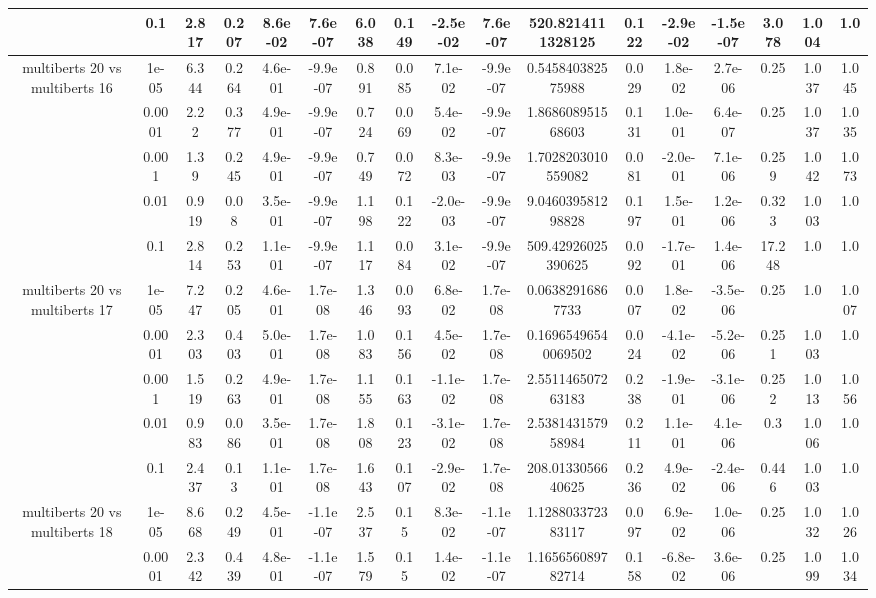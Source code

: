 \begin{tabular}{|c|c|c|c|c|c|c|c|c|c|c|c|c|c|c|c|c|}
 & 0.1 & 2.817 & 0.207 & 8.6e-02 & 7.6e-07 & 6.038 & 0.149 & -2.5e-02 & 7.6e-07 & 520.8214111328125 & 0.122 & -2.9e-02 & -1.5e-07 & 3.078 & 1.004 & 1.0 \\
\hline
\multirow{5}{*}{multiberts 20 vs multiberts 16} & 1e-05 & 6.344 & 0.264 & 4.6e-01 & -9.9e-07 & 0.891 & 0.085 & 7.1e-02 & -9.9e-07 & 0.545840382575988 & 0.029 & 1.8e-02 & 2.7e-06 & 0.25 & 1.037 & 1.045 \\
 & 0.0001 & 2.22 & 0.377 & 4.9e-01 & -9.9e-07 & 0.724 & 0.069 & 5.4e-02 & -9.9e-07 & 1.868608951568603 & 0.131 & 1.0e-01 & 6.4e-07 & 0.25 & 1.037 & 1.035 \\
 & 0.001 & 1.39 & 0.245 & 4.9e-01 & -9.9e-07 & 0.749 & 0.072 & 8.3e-03 & -9.9e-07 & 1.7028203010559082 & 0.081 & -2.0e-01 & 7.1e-06 & 0.259 & 1.042 & 1.073 \\
 & 0.01 & 0.919 & 0.08 & 3.5e-01 & -9.9e-07 & 1.198 & 0.122 & -2.0e-03 & -9.9e-07 & 9.046039581298828 & 0.197 & 1.5e-01 & 1.2e-06 & 0.323 & 1.003 & 1.0 \\
 & 0.1 & 2.814 & 0.253 & 1.1e-01 & -9.9e-07 & 1.117 & 0.084 & 3.1e-02 & -9.9e-07 & 509.42926025390625 & 0.092 & -1.7e-01 & 1.4e-06 & 17.248 & 1.0 & 1.0 \\
\hline
\multirow{5}{*}{multiberts 20 vs multiberts 17} & 1e-05 & 7.247 & 0.205 & 4.6e-01 & 1.7e-08 & 1.346 & 0.093 & 6.8e-02 & 1.7e-08 & 0.06382916867733 & 0.007 & 1.8e-02 & -3.5e-06 & 0.25 & 1.0 & 1.007 \\
 & 0.0001 & 2.303 & 0.403 & 5.0e-01 & 1.7e-08 & 1.083 & 0.156 & 4.5e-02 & 1.7e-08 & 0.16965496540069502 & 0.024 & -4.1e-02 & -5.2e-06 & 0.251 & 1.003 & 1.0 \\
 & 0.001 & 1.519 & 0.263 & 4.9e-01 & 1.7e-08 & 1.155 & 0.163 & -1.1e-02 & 1.7e-08 & 2.551146507263183 & 0.238 & -1.9e-01 & -3.1e-06 & 0.252 & 1.013 & 1.056 \\
 & 0.01 & 0.983 & 0.086 & 3.5e-01 & 1.7e-08 & 1.808 & 0.123 & -3.1e-02 & 1.7e-08 & 2.538143157958984 & 0.211 & 1.1e-01 & 4.1e-06 & 0.3 & 1.006 & 1.0 \\
 & 0.1 & 2.437 & 0.13 & 1.1e-01 & 1.7e-08 & 1.643 & 0.107 & -2.9e-02 & 1.7e-08 & 208.0133056640625 & 0.236 & 4.9e-02 & -2.4e-06 & 0.446 & 1.003 & 1.0 \\
\hline
\multirow{5}{*}{multiberts 20 vs multiberts 18} & 1e-05 & 8.668 & 0.249 & 4.5e-01 & -1.1e-07 & 2.537 & 0.15 & 8.3e-02 & -1.1e-07 & 1.128803372383117 & 0.097 & 6.9e-02 & 1.0e-06 & 0.25 & 1.032 & 1.026 \\
 & 0.0001 & 2.342 & 0.439 & 4.8e-01 & -1.1e-07 & 1.579 & 0.15 & 1.4e-02 & -1.1e-07 & 1.165656089782714 & 0.158 & -6.8e-02 & 3.6e-06 & 0.25 & 1.099 & 1.034 \\

\end{tabular}
